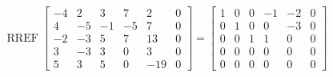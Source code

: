 \begin{exerciseAnswer} 


\[\operatorname{RREF} \left[\begin{array}{ccccc|c}
-4 & 2 & 3 & 7 & 2 & 0 \\
4 & -5 & -1 & -5 & 7 & 0 \\
-2 & -3 & 5 & 7 & 13 & 0 \\
3 & -3 & 3 & 0 & 3 & 0 \\
5 & 3 & 5 & 0 & -19 & 0
\end{array}\right] = \left[\begin{array}{ccccc|c}
1 & 0 & 0 & -1 & -2 & 0 \\
0 & 1 & 0 & 0 & -3 & 0 \\
0 & 0 & 1 & 1 & 0 & 0 \\
0 & 0 & 0 & 0 & 0 & 0 \\
0 & 0 & 0 & 0 & 0 & 0
\end{array}\right] \]



\end{exerciseAnswer}
